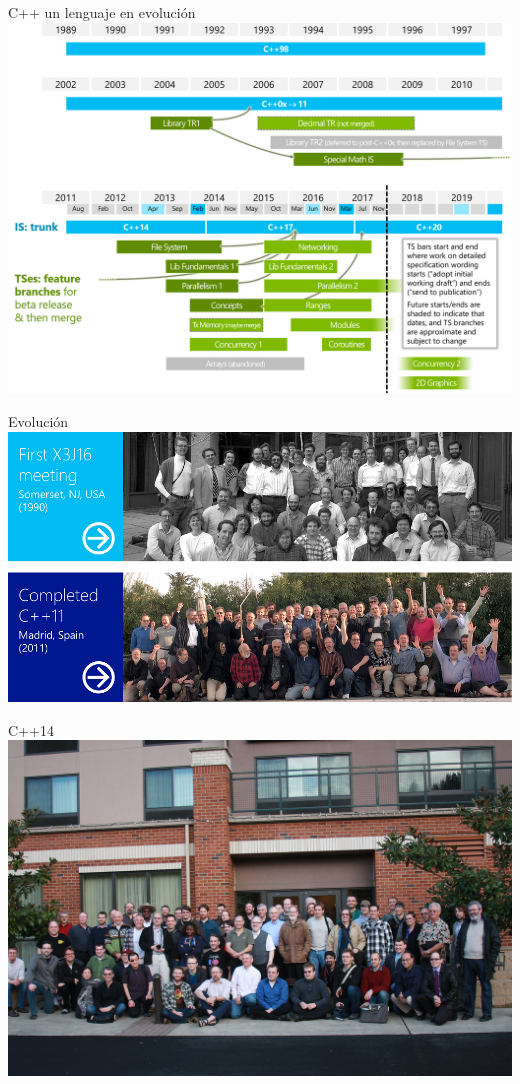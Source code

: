 \begin{frame}[t]{C++ un lenguaje en evolución}
\includegraphics[width=\textwidth]{img/wg21-timeline.png}
\end{frame}

\begin{frame}[t]{Evolución}
\includegraphics[width=\textwidth]{img/wg21-1990-2011.png}
\end{frame}

\begin{frame}[t]{C++14}
\includegraphics[width=\textwidth]{img/cpp-14.jpg}
\end{frame}


